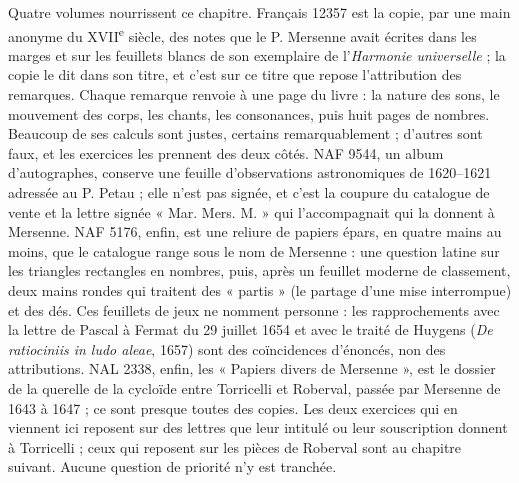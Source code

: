 \documentclass[11pt,a4paper]{article}
\begin{document}
Quatre volumes nourrissent ce chapitre. Français 12357 est la copie, par une main
anonyme du XVII\textsuperscript{e} siècle, des notes que le P. Mersenne avait
écrites dans les marges et sur les feuillets blancs de son exemplaire de
l'\emph{Harmonie universelle} ; la copie le dit dans son titre, et c'est sur ce
titre que repose l'attribution des remarques. Chaque remarque renvoie à une page
du livre : la nature des sons, le mouvement des corps, les chants, les
consonances, puis huit pages de nombres. Beaucoup de ses calculs sont justes,
certains remarquablement ; d'autres sont faux, et les exercices les prennent des
deux côtés. NAF 9544, un album d'autographes, conserve une feuille d'observations
astronomiques de 1620--1621 adressée au P. Petau ; elle n'est pas signée, et
c'est la coupure du catalogue de vente et la lettre signée « Mar. Mers. M. » qui
l'accompagnait qui la donnent à Mersenne. NAF 5176, enfin, est une reliure de
papiers épars, en quatre mains au moins, que le catalogue range sous le nom de
Mersenne : une question latine sur les triangles rectangles en nombres, puis,
après un feuillet moderne de classement, deux mains rondes qui traitent des
« partis » (le partage d'une mise interrompue) et des dés. Ces feuillets de jeux
ne nomment personne : les rapprochements avec la lettre de Pascal à Fermat du
29 juillet 1654 et avec le traité de Huygens (\emph{De ratiociniis in ludo
aleae}, 1657) sont des coïncidences d'énoncés, non des attributions.
NAL 2338, enfin, les « Papiers divers de Mersenne », est le dossier de la
querelle de la cycloïde entre Torricelli et Roberval, passée par Mersenne de
1643 à 1647 ; ce sont presque toutes des copies. Les deux exercices qui en
viennent ici reposent sur des lettres que leur intitulé ou leur souscription
donnent à Torricelli ; ceux qui reposent sur les pièces de Roberval sont au
chapitre suivant. Aucune question de priorité n'y est tranchée.
\end{document}
